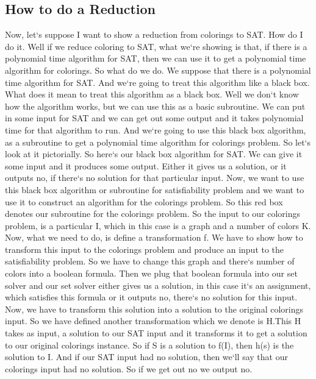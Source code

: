\subsection{How to do a Reduction}
Now, let`s suppose I want to show a reduction from colorings to SAT\@.
How do I do it.
Well if we reduce coloring to SAT, what we`re showing is that, if there is a polynomial time algorithm for SAT, then we can use it to get a polynomial time algorithm for colorings.
So what do we do.
We suppose that there is a polynomial time algorithm for SAT\@.
And we`re going to treat this algorithm like a black box.
What does it mean to treat this algorithm as a black box.
Well we don`t know how the algorithm works, but we can use this as a basic subroutine.
We can put in some input for SAT and we can get out some output and it takes polynomial time for that algorithm to run.
And we`re going to use this black box algorithm, as a subroutine to get a polynomial time algorithm for colorings problem.
So let`s look at it pictorially.
So here`s our black box algorithm for SAT\@.
We can give it some input and it produces some output.
Either it gives us a solution, or it outputs no, if there`s no solution for that particular input.
Now, we want to use this black box algorithm or subroutine for satisfiability problem and we want to use it to construct an algorithm for the colorings problem.
So this red box denotes our subroutine for the colorings problem.
So the input to our colorings problem, is a particular I, which in this case is a graph and a number of colors K\@.
Now, what we need to do, is define a transformation f.
We have to show how to transform this input to the colorings problem and produce an input to the satisfiability problem.
So we have to change this graph and there`s number of colors into a boolean formula.
Then we plug that boolean formula into our set solver and our set solver either gives us a solution, in this case it`s an assignment, which satisfies this formula or it outputs no, there`s no solution for this input.
Now, we have to transform this solution into a solution to the original colorings input.
So we have defined another transformation which we denote is H\@.This H takes as input, a solution to our SAT input and it transforms it to get a solution to our original colorings instance.
So if S is a solution to f(I), then h(s) is the solution to I\@.
And if our SAT input had no solution, then we`ll say that our colorings input had no solution.
So if we get out no we output no.

